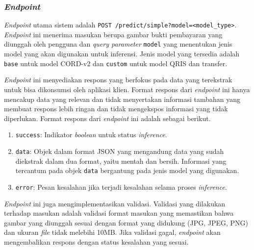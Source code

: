 
\subsubsection{\emph{Endpoint}}
\label{subsubsec:endpoint}

\emph{Endpoint} utama sistem adalah \texttt{POST /predict/simple?model=<model\_type>}. \emph{Endpoint} ini menerima masukan berupa gambar bukti pembayaran yang diunggah oleh pengguna dan \emph{query parameter} \texttt{model} yang menentukan jenis model yang akan digunakan untuk inferensi. Jenis model yang tersedia adalah \texttt{base} untuk model \donut{} CORD-v2 dan \texttt{custom} untuk model \donut{} QRIS dan transfer.

\emph{Endpoint} ini menyediakan respons yang berfokus pada data yang terekstrak untuk bisa dikonsumsi oleh aplikasi klien. Format respons dari \emph{endpoint} ini hanya mencakup data yang relevan dan tidak menyertakan informasi tambahan yang membuat respons lebih ringan dan tidak mengekspos informasi yang tidak diperlukan. Format respons dari \emph{endpoint} ini adalah sebagai berikut.
\begin{enumerate}
    \item \texttt{success}: Indikator \emph{boolean} untuk status \emph{inference}.
    \item \texttt{data}: Objek dalam format JSON yang mengandung data yang sudah diekstrak dalam dua format, yaitu mentah dan bersih. Informasi yang tercantum pada objek \texttt{data} bergantung pada jenis model yang digunakan.
    \item \texttt{error}: Pesan kesalahan jika terjadi kesalahan selama proses \emph{inference}.
\end{enumerate}

\emph{Endpoint} ini juga mengimplementasikan validasi. Validasi yang dilakukan terhadap masukan adalah validasi format masukan yang memastikan bahwa gambar yang diunggah sesuai dengan format yang didukung (JPG, JPEG, PNG) dan ukuran \emph{file} tidak melebihi 10MB. Jika validasi gagal, \emph{endpoint} akan mengembalikan respons dengan status kesalahan yang sesuai.


